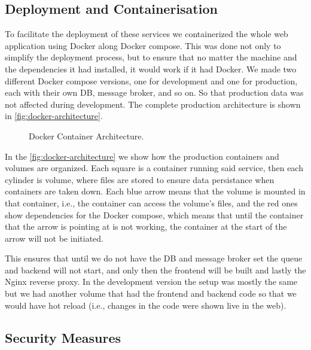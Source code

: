 \subsection{Deployment and Containerisation}



To facilitate the deployment of these services
we containerized the whole web application using Docker \autocite{merkelDockerLightweightLinux2014} along Docker compose.
This was done not only to simplify the deployment process,
but to ensure that no matter the machine and the dependencies it had installed,
it would work if it had Docker.
We made two different Docker compose versions, one for development and one for production,
each with their own \ac{DB}, message broker, and so on.
So that production data was not affected during development.
The complete production architecture is shown in \autoref{fig:docker-architecture}.

\begin{figure}[htpb]
    \centering
    
    \caption{Docker Container Architecture.}
    \label{fig:docker-architecture}
\end{figure}

In the \autoref{fig:docker-architecture} we show how the production containers and volumes are organized.
Each square is a container running said service,
then each cylinder is volume, where files are stored to ensure data persistance when containers are taken down.
Each blue arrow means that the volume is mounted in that container, i.e., the container can access the volume's files,
and the red ones show dependencies for the Docker compose,
which means that until the container that the arrow is pointing at is not working,
the container at the start of the arrow will not be initiated.

This ensures that until we do not have the \ac{DB} and message broker set
the queue and backend will not start,
and only then the frontend will be built
and lastly the Nginx reverse proxy.
In the development version the setup was mostly the same
but we had another volume that had the frontend and backend code
so that we would have hot reload (i.e., changes in the code were shown live in the web).

\subsection{Security Measures}

